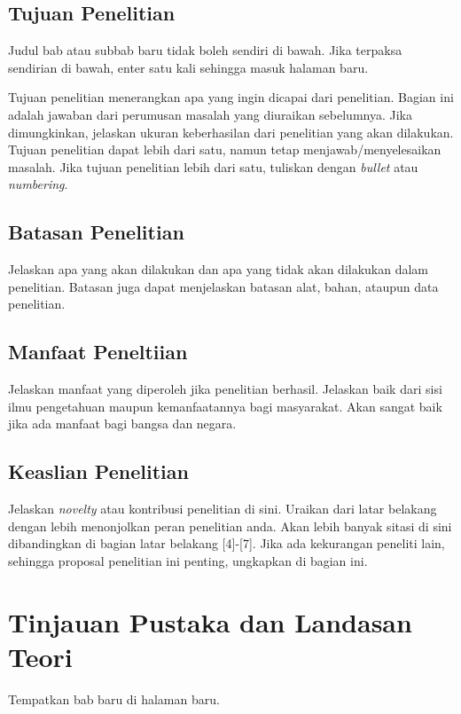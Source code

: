 \documentclass[12pt]{article}
\begin{document}
\subsection{Tujuan Penelitian}

Judul bab atau subbab baru tidak boleh sendiri di bawah. Jika terpaksa sendirian di bawah, enter satu kali sehingga masuk halaman baru. 

Tujuan penelitian menerangkan apa yang ingin dicapai dari penelitian. Bagian ini adalah jawaban dari perumusan masalah yang diuraikan sebelumnya. Jika dimungkinkan, jelaskan ukuran keberhasilan dari penelitian yang akan dilakukan. Tujuan penelitian dapat lebih dari satu, namun tetap menjawab/menyelesaikan masalah. Jika tujuan penelitian lebih dari satu, tuliskan dengan \textit{bullet} atau \textit{numbering}. 


\subsection{Batasan Penelitian}
Jelaskan apa yang akan dilakukan dan apa yang tidak akan dilakukan dalam penelitian. Batasan juga dapat menjelaskan batasan alat, bahan, ataupun data penelitian. 

\subsection{Manfaat Peneltiian}
Jelaskan manfaat yang diperoleh jika penelitian berhasil. Jelaskan baik dari sisi ilmu pengetahuan maupun kemanfaatannya bagi masyarakat. Akan sangat baik jika ada manfaat bagi bangsa dan negara.

\subsection{Keaslian Penelitian}
Jelaskan \textit{novelty} atau kontribusi penelitian di sini. Uraikan dari latar belakang dengan lebih menonjolkan peran penelitian anda. Akan lebih banyak sitasi di sini dibandingkan di bagian latar belakang [4]-[7]. Jika ada kekurangan peneliti lain, sehingga proposal penelitian ini penting, ungkapkan di bagian ini.
 
\pagebreak{}



\section{Tinjauan Pustaka dan Landasan Teori}
Tempatkan bab baru di halaman baru. 
\end{document}
